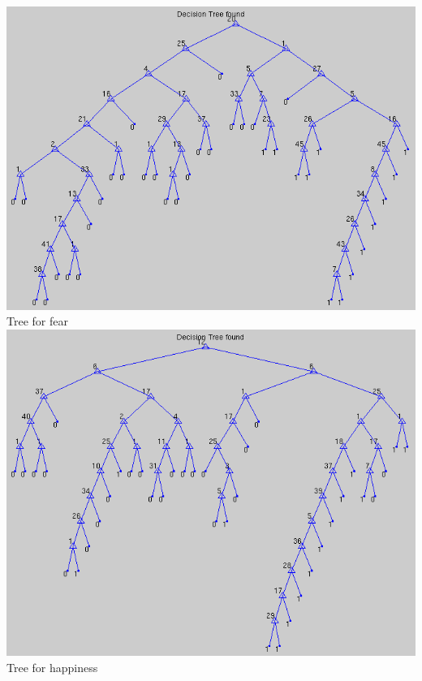 \documentclass[12pt]{article}
\begin{document}
\begin{center}
  \includegraphics[scale=0.28]{report-images/tree3.png} \\
  Tree for fear \\
  \vspace{\baselineskip}
  \includegraphics[scale=0.28]{report-images/tree4.png} \\
  Tree for happiness \\
  \vspace{\baselineskip}

\end{center}
\end{document}
